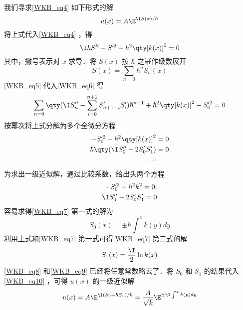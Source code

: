 我们寻求\autoref{WKB_eq4} 如下形式的解
\begin{equation}\label{WKB_eq10}
u(x)=A\E^{\I S(x)/\hbar}
\end{equation}
将上式代入\autoref{WKB_eq4} ，得
\begin{equation}\label{WKB_eq6}
\I\hbar S''-S'^2+\hbar^2\qty[k(x)]^2=0
\end{equation}
其中，撇号表示对 $x$ 求导．将 $S(x)$ 按 $\hbar$ 之幂作级数展开
\begin{equation}\label{WKB_eq5}
S(x)=\sum_{n=0}\hbar^nS_n(x)
\end{equation}
\autoref{WKB_eq5} 代入\autoref{WKB_eq6} 得
\begin{equation}
\sum_{n=0}\qty(\I S_n''-\sum_{i=0}^{n+1}S_{n+1-i}'S_i')\hbar^{n+1}+\hbar^2\qty[k(x)]^2-S_0'^2=0
\end{equation}
按幂次将上式分解为多个全微分方程
\begin{equation}
\begin{aligned}
-S_0'^2+\hbar^2\qty[k(x)]^2&=0\\
\hbar\qty(\I S_0''-2S_0'S_1')&=0\\
\cdots
\end{aligned}
\end{equation}
为求出一级近似解，通过比较系数，给出头两个方程
\begin{equation}\label{WKB_eq7}
\begin{aligned}
-S_0'^2+\hbar^2k^2=0;\\
\I S_0''-2S_0'S_1'=0
\end{aligned}
\end{equation}
容易求得\autoref{WKB_eq7} 第一式的解为
\begin{equation}\label{WKB_eq8}
S_0(x)=\pm\hbar\int^x k(y)dy
\end{equation}
利用上式和\autoref{WKB_eq7} 第一式可得\autoref{WKB_eq7} 第二式的解
\begin{equation}\label{WKB_eq9}
S_1(x)=\frac{\I}{2}\ln k(x)
\end{equation}
\autoref{WKB_eq8} 和\autoref{WKB_eq9} 已经将任意常数略去了．将 $S_0$ 和 $S_1$ 的结果代入\autoref{WKB_eq10} ，可得 $u(x)$ 的一级近似解
\begin{equation}\label{WKB_eq11}
u(x)=A\E^{\I(S_0+\hbar S_1)/\hbar}=\frac{A}{\sqrt{k}} \E^{\pm\I\int^x k(y)dy}
\end{equation}
